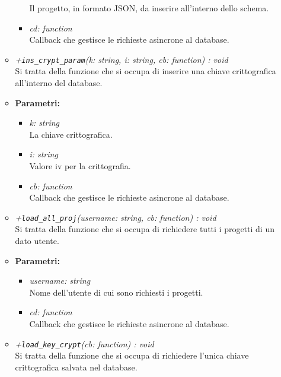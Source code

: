\begin{itemize}
\begin{itemize}
\begin{itemize}
              Il progetto, in formato JSON, da inserire all'interno dello schema.
              \item \emph{cd: function}\\
              Callback che gestisce le richieste asincrone al database.
            \end{itemize}
            \item \emph{+\texttt{ins\_crypt\_param}(k: string, i: string, cb: function) : void}\\
            Si tratta della funzione che si occupa di inserire una chiave crittografica all'interno del database.\\
            \item \textbf{Parametri: }\\
            \begin{itemize}
              \item \emph{k: string}\\
              La chiave crittografica.
              \item \emph{i: string}\\
              Valore iv per la crittografia.
              \item \emph{cb: function}\\
              Callback che gestisce le richieste asincrone al database.
            \end{itemize}
            \item \emph{+\texttt{load\_all\_proj}(username: string, cb: function) : void}\\
            Si tratta della funzione che si occupa di richiedere tutti i progetti di un dato utente.\\
            \item \textbf{Parametri: }\\
            \begin{itemize}
              \item \emph{username: string}\\
              Nome dell'utente di cui sono richiesti i progetti.
              \item \emph{cd: function}\\
              Callback che gestisce le richieste asincrone al database.
            \end{itemize}
            \item \emph{+\texttt{load\_key\_crypt}(cb: function) : void}\\
            Si tratta della funzione che si occupa di richiedere l'unica chiave crittografica salvata nel database.\\

\end{itemize}
\end{itemize}
